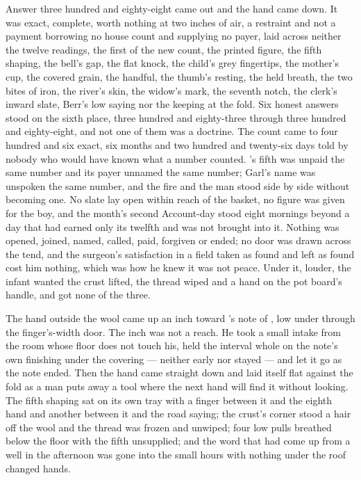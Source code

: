 Answer three hundred and eighty-eight came out and the hand came down. It was exact, complete, worth nothing at two inches of air, a restraint and not a payment borrowing no house count and supplying no payer, laid across neither the twelve readings, the first of the new count, the printed figure, the fifth shaping, the bell's gap, the flat knock, the child's grey fingertips, the mother's cup, the covered grain, the handful, the thumb's resting, the held breath, the two bites of iron, the river's skin, the widow's mark, the seventh notch, the clerk's inward slate, Berr's low saying nor the keeping at the fold. Six honest answers stood on the sixth place, three hundred and eighty-three through three hundred and eighty-eight, and not one of them was a doctrine. The count came to four hundred and six exact, six months and two hundred and twenty-six days told by nobody who would have known what a number counted. 's fifth was unpaid the same number and its payer unnamed the same number; Garl's name was unspoken the same number, and the fire and the man stood side by side without becoming one. No slate lay open within reach of the basket, no figure was given for the boy, and the month's second Account-day stood eight mornings beyond a day that had earned only its twelfth and was not brought into it. Nothing was opened, joined, named, called, paid, forgiven or ended; no door was drawn across the tend, and the surgeon's satisfaction in a field taken as found and left as found cost him nothing, which was how he knew it was not peace. Under it, louder, the infant wanted the crust lifted, the thread wiped and a hand on the pot board's handle, and got none of the three.

The hand outside the wool came up an inch toward 's note of , low under  through the finger's-width door. The inch was not a reach. He took a small intake from the room whose floor does not touch his, held the interval whole on the note's own finishing under the covering --- neither early nor stayed --- and let it go as the note ended. Then the hand came straight down and laid itself flat against the fold as a man puts away a tool where the next hand will find it without looking. The fifth shaping sat on its own tray with a finger between it and the eighth hand and another between it and the road saying; the crust's corner stood a hair off the wool and the thread was frozen and unwiped; four low pulls breathed below the floor with the fifth unsupplied; and the word that had come up from a well in the afternoon was gone into the small hours with nothing under the roof changed hands.
